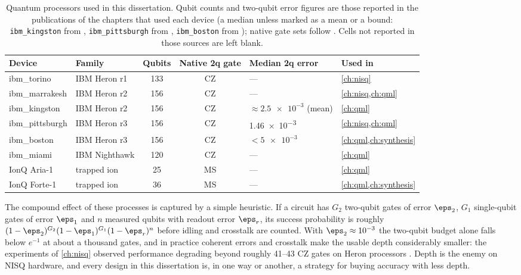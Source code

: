 \begin{table}[htbp]
\caption{Quantum processors used in this dissertation. Qubit counts and two-qubit error figures are those reported in the publications of the chapters that used each device (a median unless marked as a mean or a bound: \texttt{ibm\_kingston} from \cite{guo2025vqt}, \texttt{ibm\_pittsburgh} from \cite{guo2025shardq}, \texttt{ibm\_boston} from \cite{guo2026nnqa}); native gate sets follow \cite{guo2026rubriq}. Cells not reported in those sources are left blank.}
\label{tab:bg:devices}
\centering\footnotesize
\begin{tabular}{@{}llccll@{}}
\toprule
Device & Family & Qubits & Native 2q gate & Median 2q error & Used in \\
\midrule
ibm\_torino & IBM Heron r1 & 133 & CZ & --- & \cref{ch:nisq} \\
ibm\_marrakesh & IBM Heron r2 & 156 & CZ & --- & \cref{ch:nisq,ch:qml} \\
ibm\_kingston & IBM Heron r2 & 156 & CZ & $\approx\num{2.5e-3}$ (mean) & \cref{ch:qml} \\
ibm\_pittsburgh & IBM Heron r3 & 156 & CZ & \num{1.46e-3} & \cref{ch:nisq,ch:qml} \\
ibm\_boston & IBM Heron r3 & 156 & CZ & $<\num{5e-3}$ & \cref{ch:qml,ch:synthesis} \\
ibm\_miami & IBM Nighthawk & 120 & CZ & --- & \cref{ch:qml} \\
IonQ Aria-1 & trapped ion & 25 & MS & --- & \cref{ch:qml} \\
IonQ Forte-1 & trapped ion & 36 & MS & --- & \cref{ch:qml,ch:synthesis} \\
\bottomrule
\end{tabular}
\end{table}

The compound effect of these processes is captured by a simple heuristic. If a circuit has $G_2$ two-qubit gates of error $\eps_2$, $G_1$ single-qubit gates of error $\eps_1$ and $n$ measured qubits with readout error $\eps_r$, its success probability is roughly $(1-\eps_2)^{G_2}(1-\eps_1)^{G_1}(1-\eps_r)^{n}$ before idling and crosstalk are counted. With $\eps_2\approx10^{-3}$ the two-qubit budget alone falls below $e^{-1}$ at about a thousand gates, and in practice coherent errors and crosstalk make the usable depth considerably smaller: the \deal{} experiments of \cref{ch:nisq} observed performance degrading beyond roughly 41--43 CZ gates on Heron processors \cite{guo2025deal}. Depth is the enemy on NISQ hardware, and every design in this dissertation is, in one way or another, a strategy for buying accuracy with less depth.

